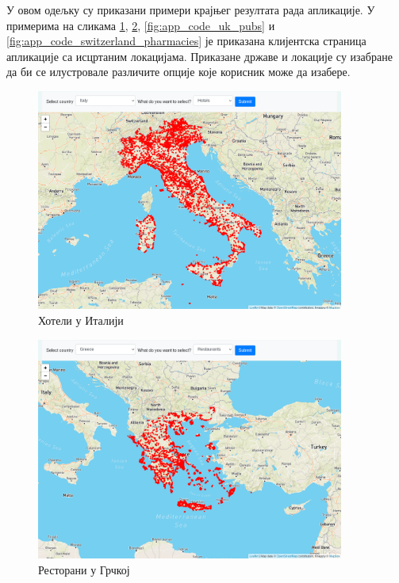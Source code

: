 \documentclass[12pt,oneside]{memoir}
\begin{document}
У овом одељку су приказани примери крајњег резултата рада апликације. У примерима на сликама \ref{fig:app_code_italy_hotel}, \ref{fig:app_code_greece_restaurants}, \ref{fig:app_code_uk_pubs} и \ref{fig:app_code_switzerland_pharmacies} је приказана клијентска страница апликације са исцртаним локацијама. Приказане државе и локације су изабране да би се илустровале различите опције које корисник може да изабере. 

\begin{figure}[!ht]
  \centering
  \includegraphics[width=0.9\textwidth]{pictures/italy_hotels.png}
  \caption{Хотели у Италији}
  \label{fig:app_code_italy_hotel}
\end{figure}

\begin{figure}[!ht]
  \centering
  \includegraphics[width=0.9\textwidth]{pictures/greece_restaurants.png}
  \caption{Ресторани у Грчкој}
  \label{fig:app_code_greece_restaurants}
\end{figure}
\end{document}
